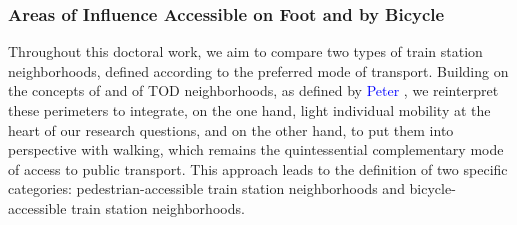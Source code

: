\begin{refsegment}
\subsubsection*{Areas of Influence Accessible on Foot and by Bicycle
    \label{chap3:quartiers-gare-taille}
    }

Throughout this doctoral work, we aim to compare two types of train station neighborhoods, defined according to the preferred mode of transport. Building on the concepts of  and  of \acrshort{TOD} neighborhoods, as defined by \textcolor{blue}{Peter} \textcolor{blue}{\textcite[60]{calthorpe_next_1993}}, we reinterpret these perimeters to integrate, on the one hand, light individual mobility at the heart of our research questions, and on the other hand, to put them into perspective with walking, which remains the quintessential complementary mode of access to public transport. This approach leads to the definition of two specific categories: pedestrian-accessible train station neighborhoods and bicycle-accessible train station neighborhoods.%


\end{refsegment}
